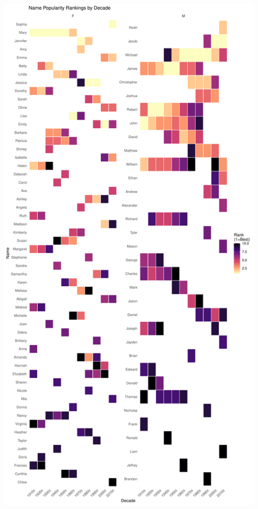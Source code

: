 \documentclass[11pt,preprint]{elsarticle}
\let\origfigure\figure
\let\endorigfigure\endfigure
\renewenvironment{figure}[1][2] {
    \expandafter\origfigure\expandafter[H]
} {
    \endorigfigure
}
\numberwithin{equation}{section}
\numberwithin{figure}{section}
\numberwithin{table}{section}
\begin{document}
\begin{figure}[H]

{\centering \includegraphics{Question1_files/figure-latex/unnamed-chunk-2-1} 

}

\caption{Most Popular Baby Names per decade (1910-2014).\label{Figure2}}\label{fig:unnamed-chunk-2}
\end{figure}
\end{document}
